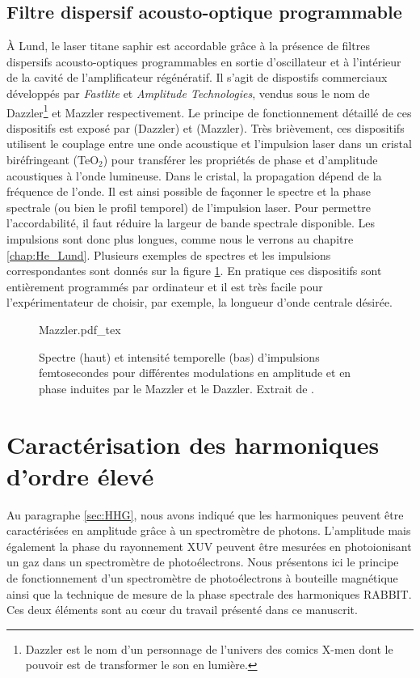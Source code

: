 \subsection{Filtre dispersif acousto-optique programmable}
\`{A} Lund, le laser titane saphir est accordable grâce à la présence de filtres dispersifs acousto-optiques programmables en sortie d'oscillateur et à l'intérieur de la cavité de l'amplificateur régénératif. Il s'agit de dispostifs commerciaux développés par \textit{Fastlite} et \textit{Amplitude Technologies}, vendus sous le nom de Dazzler\footnote{Dazzler est le nom d'un personnage de l'univers des comics X-men dont le pouvoir est de transformer le son en lumière.} et Mazzler respectivement. Le principe de fonctionnement détaillé de ces dispositifs est exposé par  (Dazzler) et
 (Mazzler). Très brièvement, ces dispositifs utilisent le couplage entre une onde acoustique et l'impulsion laser dans un cristal biréfringeant (TeO$_2$) pour transférer les propriétés de phase et d'amplitude acoustiques à l'onde lumineuse. Dans le cristal, la propagation dépend de la fréquence de l'onde. Il est ainsi possible de façonner le spectre et la phase spectrale (ou bien le profil temporel) de l'impulsion laser. Pour permettre l'accordabilité, il faut réduire la largeur de bande spectrale disponible. Les impulsions sont donc plus longues, comme nous le verrons au chapitre \ref{chap:He_Lund}. Plusieurs exemples de spectres et les impulsions correspondantes sont donnés sur la figure \ref{fig:Mazzler}. En pratique ces dispositifs sont entièrement programmés par ordinateur et il est très facile pour l'expérimentateur de choisir, par exemple, la longueur d'onde centrale désirée.

\begin{figure}
\centering
\def\svgwidth{0.5\columnwidth}
{Mazzler.pdf_tex}
\caption{Spectre (haut) et intensité temporelle (bas) d'impulsions femtosecondes pour différentes modulations en amplitude et en phase induites par le Mazzler et le Dazzler. Extrait de .}
\label{fig:Mazzler}
\end{figure}

\section{Caractérisation des harmoniques d'ordre élevé}
\label{sec:CaracHHG}
Au paragraphe \ref{sec:HHG}, nous avons indiqué que les harmoniques peuvent être caractérisées en amplitude grâce à un spectromètre de photons. L'amplitude mais également la phase du rayonnement XUV peuvent être mesurées en photoionisant un gaz dans un spectromètre de photoélectrons. Nous présentons ici le principe de fonctionnement d'un spectromètre de photoélectrons à bouteille magnétique ainsi que la technique de mesure de la phase spectrale des harmoniques RABBIT. Ces deux éléments sont au c\oe ur du travail présenté dans ce manuscrit.


